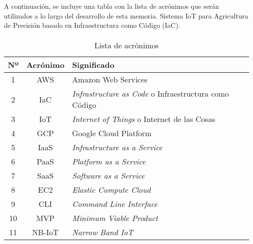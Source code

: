 \documentclass[../../memoria.tex]{subfiles}
\begin{document}
A continuación, se incluye una tabla con la lista de acrónimos que serán utilizados a lo largo del desarrollo de
esta memoria.
Sistema IoT para Agricultura de Precisión basado en Infraestructura como Código (IaC).

\paragraph{}

\begin{table}[h]
    \centering
    \begin{tabular}{ccl}
        \hline
        \multicolumn{1}{l}{\textbf{Nº}} & \multicolumn{1}{l}{\textbf{Acrónimo}} & \textbf{Significado}                                          \\ \hline
        1                               & AWS                                   & Amazon Web Services                                           \\
        2                               & IaC                                   & \textit{Infrastructure as Code} o Infraestructura como Código \\
        3                               & IoT                                   & \textit{Internet of Things} o Internet de las Cosas           \\
        4                               & GCP                                   & Google Cloud Platform                                         \\
        5                               & IaaS                                  & \textit{Infrastructure as a Service}                          \\
        6                               & PaaS                                  & \textit{Platform as a Service}                                \\
        7                               & SaaS                                  & \textit{Software as a Service}                                \\
        8                               & EC2                                   & \textit{Elastic Compute Cloud}                                \\
        9                               & CLI                                   & \textit{Command Line Interface}                               \\
        10                              & MVP                                   & \textit{Minimum Viable Product}                               \\
        11                              & NB-IoT                                & \textit{Narrow Band IoT}                                      \\
        \hline
    \end{tabular}
    \caption {Lista de acrónimos}
\end{table}
\end{document}
